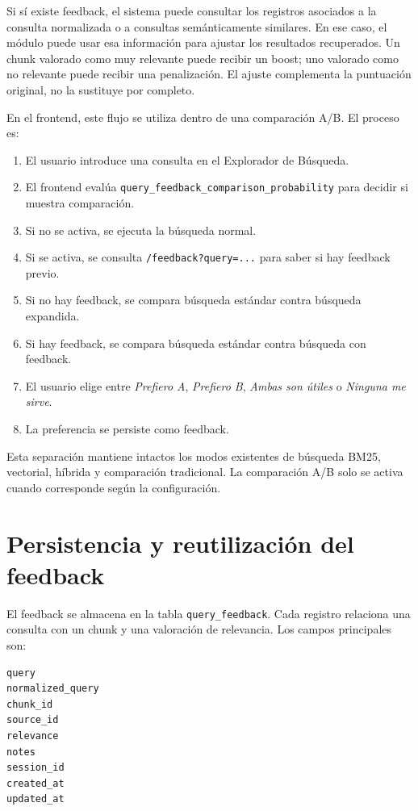 \documentclass[12pt,a4paper]{article}
\begin{document}
Si sí existe feedback, el sistema puede consultar los registros asociados a la consulta normalizada o a consultas semánticamente similares. En ese caso, el módulo puede usar esa información para ajustar los resultados recuperados. Un chunk valorado como muy relevante puede recibir un boost; uno valorado como no relevante puede recibir una penalización. El ajuste complementa la puntuación original, no la sustituye por completo.

En el frontend, este flujo se utiliza dentro de una comparación A/B. El proceso es:

\begin{enumerate}
  \item El usuario introduce una consulta en el Explorador de Búsqueda.
  \item El frontend evalúa \texttt{query\_feedback\_comparison\_probability} para decidir si muestra comparación.
  \item Si no se activa, se ejecuta la búsqueda normal.
  \item Si se activa, se consulta \texttt{/feedback?query=...} para saber si hay feedback previo.
  \item Si no hay feedback, se compara búsqueda estándar contra búsqueda expandida.
  \item Si hay feedback, se compara búsqueda estándar contra búsqueda con feedback.
  \item El usuario elige entre \textit{Prefiero A}, \textit{Prefiero B}, \textit{Ambas son útiles} o \textit{Ninguna me sirve}.
  \item La preferencia se persiste como feedback.
\end{enumerate}

Esta separación mantiene intactos los modos existentes de búsqueda BM25, vectorial, híbrida y comparación tradicional. La comparación A/B solo se activa cuando corresponde según la configuración.

\section{Persistencia y reutilización del feedback}

El feedback se almacena en la tabla \texttt{query\_feedback}. Cada registro relaciona una consulta con un chunk y una valoración de relevancia. Los campos principales son:

\begin{lstlisting}
query
normalized_query
chunk_id
source_id
relevance
notes
session_id
created_at
updated_at
\end{lstlisting}
\end{document}
